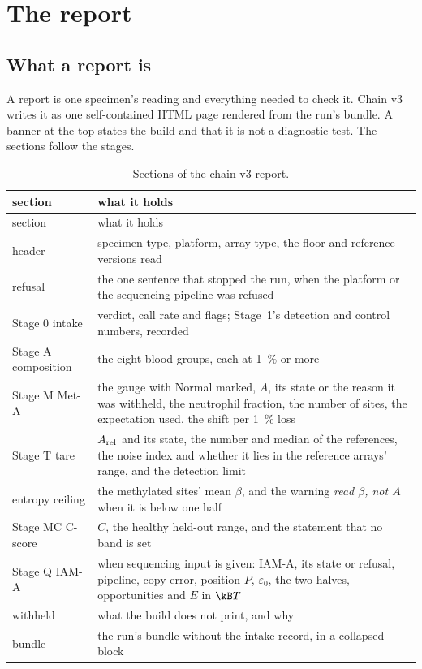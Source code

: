 \chapter{The report}\label{ch:report}

\section{What a report is}

A report is one specimen's reading and everything needed to check it. Chain v3 writes it as one self-contained HTML page rendered from the run's
bundle. A banner at the top states the build and that it is not a diagnostic test.
The sections follow the stages.

\begin{center}\small
\begin{longtable}{@{}p{}p{}@{}}
\caption{Sections of the chain v3 report.}\label{tab:tabs}\\
\toprule section & what it holds \\\midrule\endfirsthead
\toprule section & what it holds \\\midrule\endhead
header & specimen type, platform, array type, the floor and reference versions read \\
refusal & the one sentence that stopped the run, when the platform or the sequencing pipeline was refused \\
Stage 0 intake & verdict, call rate and flags; Stage~1's detection and control numbers, recorded \\
Stage A composition & the eight blood groups, each at 1~\% or more \\
Stage M Met-A & the gauge with Normal marked, $A$, its state or the reason it was withheld, the neutrophil fraction, the number of sites, the expectation used, the shift per 1~\% loss \\
Stage T tare & $A_{\rm rel}$ and its state, the number and median of the references, the noise index and whether it lies in the reference arrays' range, and the detection limit \\
entropy ceiling & the methylated sites' mean $\beta$, and the warning \emph{read $\beta$, not $A$} when it is below one half \\
Stage MC C-score & $C$, the healthy held-out range, and the statement that no band is set \\
Stage Q IAM-A & when sequencing input is given: IAM-A, its state or refusal, pipeline, copy error, position $P$, $\varepsilon_0$, the two halves, opportunities and $E$ in $\kB T$ \\
withheld & what the build does not print, and why \\
bundle & the run's bundle without the intake record, in a collapsed block \\\bottomrule
\end{longtable}
\end{center}

